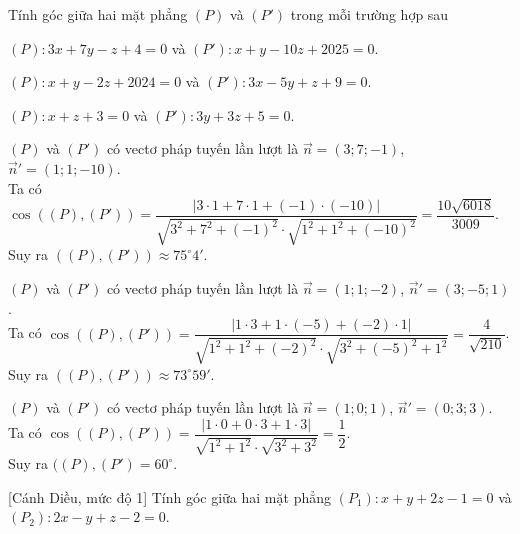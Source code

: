 \begin{bt}%

	Tính góc giữa hai mặt phẳng $(P)$ và $(P')$ trong mỗi trường hợp sau
	\begin{listEX}[1]
		\item $(P)\colon 3x+7y-z+4=0$ và $(P')\colon x+y-10z+2025=0$.
		\item $(P)\colon x+y-2z+2024=0$ và $(P')\colon 3x-5y+z+9=0$.
		\item $(P)\colon x+z+3=0$ và $(P')\colon 3y+3z+5=0$.
	\end{listEX}
	\loigiai
	{
		\begin{listEX}[1]
			\item $(P)$ và $(P')$ có vectơ pháp tuyến lần lượt là $\overrightarrow{n}=(3;7;-1)$, $\overrightarrow{n}'=(1;1;-10)$.\\
			Ta có $\cos\left ((P),(P') \right )=\dfrac{\left |3\cdot 1+7\cdot 1+(-1)\cdot (-10) \right |}{\sqrt{3^2+7^2+(-1)^2}\cdot\sqrt{1^2+1^2+(-10)^2}}=\dfrac{10\sqrt{6018}}{3009}$.\\
			Suy ra $((P),(P'))\approx 75^{\circ}4'$.
			\item $(P)$ và $(P')$ có vectơ pháp tuyến lần lượt là $\overrightarrow{n}=(1;1;-2)$, $\overrightarrow{n}'=(3;-5;1)$.\\
			Ta có $\cos\left ((P),(P') \right )=\dfrac{\left |1\cdot 3+1\cdot (-5)+(-2)\cdot 1 \right |}{\sqrt{1^2+1^2+(-2)^2}\cdot\sqrt{3^2+(-5)^2+1^2}}=\dfrac{4}{\sqrt{210}}$.\\
			Suy ra $((P),(P'))\approx 73^{\circ}59'$.
			\item $(P)$ và $(P')$ có vectơ pháp tuyến lần lượt là $\overrightarrow{n}=(1;0;1)$, $\overrightarrow{n}'=(0;3;3)$.\\
			Ta có $\cos\left ((P),(P') \right )=\dfrac{\left |1\cdot 0+0\cdot 3+1\cdot 3 \right |}{\sqrt{1^2+1^2}\cdot\sqrt{3^2+3^2}}=\dfrac{1}{2}$.\\
			Suy ra $((P),(P')=60^{\circ}$.
		\end{listEX}
	}
\end{bt}

\begin{bt}%
[Cánh Diều, mức độ 1]%
	Tính góc giữa hai mặt phẳng $(P_1)\colon x+y+2z-1=0$ và $(P_2)\colon 2x-y+z-2=0$.
\end{bt}

